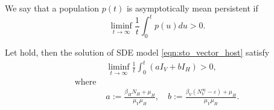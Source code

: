 \begin{definition}
    We say that a population $p(t)$ is asymptotically mean persistent
    if
    $$
        \liminf_{t \to \infty}
            \frac{1}{t}
                \int_{0} ^ t
                    p(u) du
        > 0.
    $$
\end{definition}
\begin{theorem}
    Let  hold, then the solution of SDE model
    \eqref{eqn:sto_vector_host} satisfy
    \begin{align*}
        &\liminf_{t \to \infty}
            \frac{1}{t}
            \int_{0} ^ {t}
            (a I_V + b I_H) > 0, 
            \\
                \text{where }
            &
            \\
            & a:= \frac{\beta_H N_H + \mu_H}{\mu_V \mu_H},
            \quad
            b:=
            \frac{
                \beta_V (N_V ^ {\infty} - \varepsilon)
                + \mu_H
                }{\mu_V \mu_H}.
    \end{align*}
\end{theorem}
%
